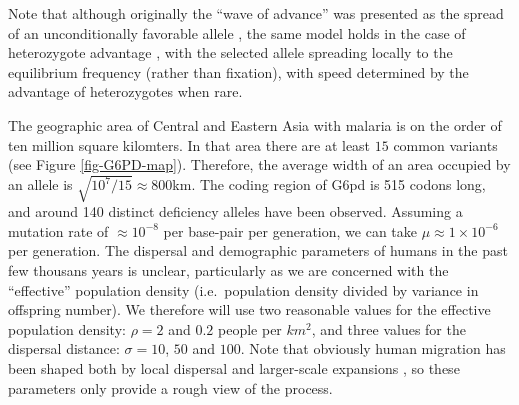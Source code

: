 \documentclass{article}
\begin{document}
Note that although originally the ``wave of advance'' was presented as the spread of an unconditionally favorable allele
\citep{fisher1936,KPP},
the same model holds in the case of heterozygote advantage \citep{aronson1975nonlinear}, 
with the selected allele spreading locally to the equilibrium frequency (rather than fixation),
with speed determined by the advantage of heterozygotes when rare.





The geographic area of Central and Eastern Asia with malaria is 
on the order of ten million square kilomters.
In that area there are at least $15$ common variants \citep{Howes-g6pd-variants} (see Figure \ref{fig-G6PD-map}). 
Therefore, the average width of an area occupied by an allele is $\sqrt{10^7/15} \approx  800$km. 
The coding region of G6pd is 515 codons long, 
and around 140 distinct deficiency alleles have been observed. 
Assuming a mutation rate of $\approx 10^{-8}$ per base-pair per generation, 
we can take $\mu \approx 1 \times 10^{-6}$ per generation. 
The dispersal and demographic parameters of humans in the past few thousans years is unclear,
particularly as we are concerned with the ``effective'' population density
(i.e.\ population density divided by variance in offspring number).
We therefore will use two reasonable values for the effective population density: $\rho=2$ and $0.2$ people per $km^2$,
and three values for the dispersal distance: $\sigma=10$, $50$ and $100$.
Note that obviously human migration has been shaped both by local dispersal and larger-scale expansions 
\citep[see ][for a recent discussion]{}, 
so these parameters only provide a rough view of the process.
\end{document}
